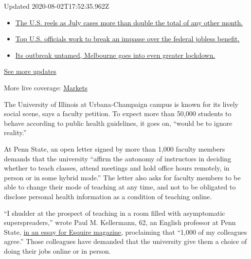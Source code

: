 Updated 2020-08-02T17:52:35.962Z

\begin{itemize}
\tightlist
\item
  \href{https://www.nytimes.com/2020/08/01/world/coronavirus-covid-19.html?action=click\&pgtype=Article\&state=default\&region=MAIN_CONTENT_1\&context=storylines_live_updates\#link-34047410}{The
  U.S. reels as July cases more than double the total of any other
  month.}
\item
  \href{https://www.nytimes.com/2020/08/01/world/coronavirus-covid-19.html?action=click\&pgtype=Article\&state=default\&region=MAIN_CONTENT_1\&context=storylines_live_updates\#link-780ec966}{Top
  U.S. officials work to break an impasse over the federal jobless
  benefit.}
\item
  \href{https://www.nytimes.com/2020/08/01/world/coronavirus-covid-19.html?action=click\&pgtype=Article\&state=default\&region=MAIN_CONTENT_1\&context=storylines_live_updates\#link-2bc8948}{Its
  outbreak untamed, Melbourne goes into even greater lockdown.}
\end{itemize}

\href{https://www.nytimes.com/2020/08/01/world/coronavirus-covid-19.html?action=click\&pgtype=Article\&state=default\&region=MAIN_CONTENT_1\&context=storylines_live_updates}{See
more updates}

More live coverage:
\href{https://www.nytimes.com/live/2020/07/31/business/stock-market-today-coronavirus?action=click\&pgtype=Article\&state=default\&region=MAIN_CONTENT_1\&context=storylines_live_updates}{Markets}

The University of Illinois at Urbana-Champaign campus is known for its
lively social scene, says a faculty petition. To expect more than 50,000
students to behave according to public health guidelines, it goes on,
``would be to ignore reality.''

At Penn State, an open letter signed by more than 1,000 faculty members
demands that the university ``affirm the autonomy of instructors in
deciding whether to teach classes, attend meetings and hold office hours
remotely, in person or in some hybrid mode.'' The letter also asks for
faculty members to be able to change their mode of teaching at any time,
and not to be obligated to disclose personal health information as a
condition of teaching online.

``I shudder at the prospect of teaching in a room filled with
asymptomatic superspreaders,'' wrote Paul M. Kellermann, 62, an English
professor at Penn State,
\href{https://www.esquire.com/news-politics/a32973676/penn-state-university-covid-19-petition-professors/}{in
an essay for Esquire magazine}, proclaiming that ``1,000 of my
colleagues agree.'' Those colleagues have demanded that the university
give them a choice of doing their jobs online or in person.

